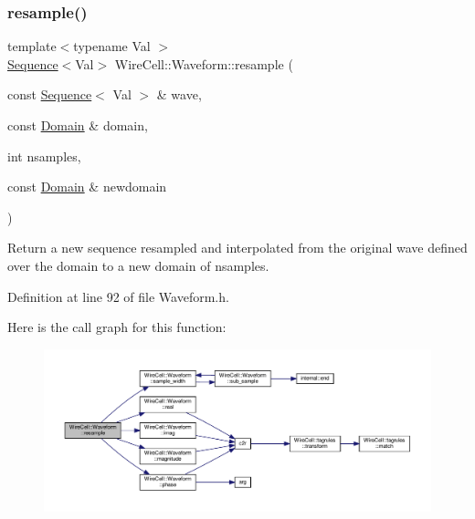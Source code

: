 \subsubsection{\texorpdfstring{resample()}{resample()}}
{\footnotesize\ttfamily template$<$typename Val $>$ \\
\hyperlink{namespace_wire_cell_1_1_waveform_a1d2a1b672e3b220dcd64a994531de95d}{Sequence}$<$Val$>$ Wire\+Cell\+::\+Waveform\+::resample (\begin{DoxyParamCaption}\item[{const \hyperlink{namespace_wire_cell_1_1_waveform_a1d2a1b672e3b220dcd64a994531de95d}{Sequence}$<$ Val $>$ \&}]{wave,  }\item[{const \hyperlink{namespace_wire_cell_1_1_waveform_aa783b1c2a84242349d5c798b7483727b}{Domain} \&}]{domain,  }\item[{int}]{nsamples,  }\item[{const \hyperlink{namespace_wire_cell_1_1_waveform_aa783b1c2a84242349d5c798b7483727b}{Domain} \&}]{newdomain }\end{DoxyParamCaption})}

Return a new sequence resampled and interpolated from the original wave defined over the domain to a new domain of nsamples. 

Definition at line 92 of file Waveform.\+h.

Here is the call graph for this function\+:
\nopagebreak
\begin{figure}[H]
\begin{center}
\leavevmode
\includegraphics[width=350pt]{namespace_wire_cell_1_1_waveform_ad08232b659cba09cf7174b900c557be5_cgraph}
\end{center}
\end{figure}
\mbox{\label{namespace_wire_cell_1_1_waveform_a5f342071d33324064758877fb128e062}} 
